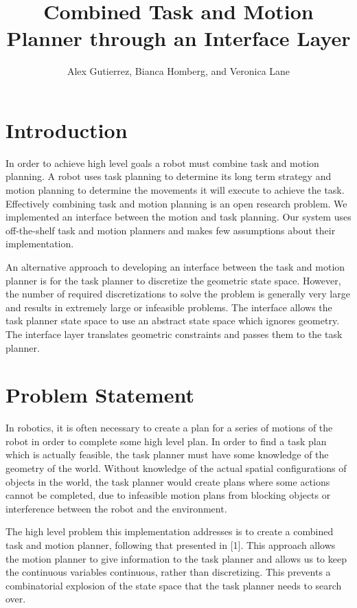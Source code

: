 \documentclass[12pt]{article}
\title{Combined Task and Motion Planner through an Interface Layer}
\author{Alex Gutierrez, Bianca Homberg, and Veronica Lane}
\begin{document}
\maketitle

\section{Introduction}

In order to achieve high level goals a robot must combine task and motion planning. 
A robot uses task planning to determine its long term strategy and motion planning to determine the movements it  will execute to achieve the task. 
Effectively combining task and motion planning is an open research problem. 
We implemented an interface between the motion and task planning. 
Our system uses off-the-shelf task and motion planners and makes few assumptions about their implementation.
 
An alternative approach to developing an interface between the task and motion planner is for the task planner to discretize the geometric state space. 
However, the number of required discretizations to solve the problem is generally very large and results in extremely large or infeasible problems. 
The interface allows the task planner state space to use an abstract state space which ignores geometry. 
The interface layer translates geometric constraints and passes them to the task planner.

\section{Problem Statement}

In robotics, it is often necessary to create a plan for a series of motions of the robot in order to complete some high level plan.
In order to find a task plan which is actually feasible, the task planner must have some knowledge of the geometry of the world.
Without knowledge of the actual spatial configurations of objects in the world, the task planner would create plans where some actions cannot be completed, due to infeasible motion plans from blocking objects or interference between the robot and the environment.

The high level problem this implementation addresses is to create a combined task and motion planner, following that presented in [1].  
This approach allows the motion planner to give information to the task planner and allows us to keep the continuous variables continuous, rather than discretizing.  
This prevents a combinatorial explosion of the state space that the task planner needs to search over.
\end{document}
